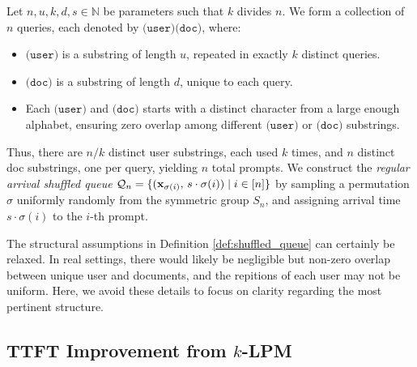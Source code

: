 \begin{definition}\label{def:shuffled_queue}
Let $n, u, k, d, s \in \mathbb{N}$ be parameters such that $k$ divides $n$. We form a collection of $n$ queries, each denoted by $\texttt{(user)(doc)}$, where:
\begin{itemize}
    \item $\texttt{(user)}$ is a substring of length $u$, repeated in exactly $k$ distinct queries.
    \item $\texttt{(doc)}$ is a substring of length $d$, unique to each query.
    \item Each $\texttt{(user)}$ and $\texttt{(doc)}$ starts with a distinct character from a large enough alphabet, ensuring zero overlap among different $\texttt{(user)}$ or $\texttt{(doc)}$ substrings.
\end{itemize}
Thus, there are $n/k$ distinct user substrings, each used $k$ times, and $n$ distinct doc substrings, one per query, yielding $n$ total prompts. We construct the \emph{regular arrival shuffled queue} $\mathcal{Q}_n = \{(\mathbf{x}_{\sigma(i)},\, s \cdot \sigma(i)) \mid i \in [n]\}$ by sampling a permutation $\sigma$ uniformly randomly from the symmetric group $S_n$, and assigning arrival time $s \cdot \sigma(i)$ to the $i$-th prompt.
\end{definition}

The structural assumptions in Definition \ref{def:shuffled_queue} can certainly be relaxed. In real settings, there would likely be negligible but non-zero overlap between unique user and documents, and the repitions of each user may not be uniform. Here, we avoid these details to focus on clarity regarding the most pertinent structure.

\subsection{TTFT Improvement from $k$-LPM }

